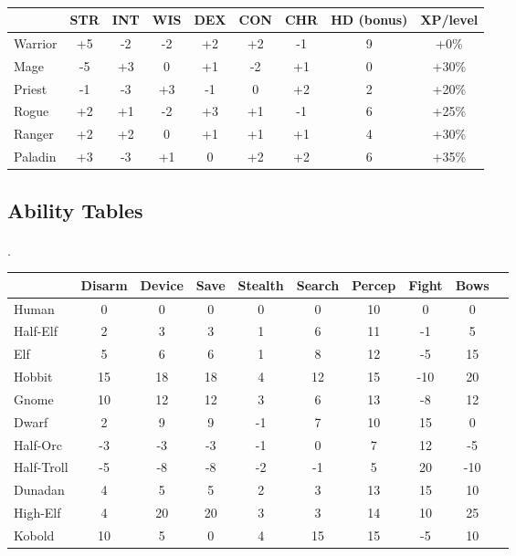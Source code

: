 \paragraph{}
\begin{tabular}{|l|c|c|c|c|c|c|c|c|}
\hline
   & STR & INT & WIS & DEX & CON & CHR & HD (bonus) & XP/level \\
\hline
Warrior & +5 & -2 & -2 & +2 & +2 & -1 & 9 & +0\%\\
Mage & -5 & +3 & 0 & +1 & -2 & +1 & 0 & +30\%\\
Priest & -1 & -3 & +3 & -1 & 0 & +2 & 2 & +20\%\\
Rogue & +2 & +1 & -2 & +3 & +1 & -1 & 6 & +25\%\\
Ranger & +2 & +2 & 0 & +1 & +1 & +1 & 4 & +30\%\\
Paladin & +3 & -3 & +1 & 0 & +2 & +2 & 6 & +35\%\\
\hline
\end{tabular}

\subsection{Ability Tables}
\paragraph{}.\\
\begin{tabular}{|l|c|c|c|c|c|c|c|c|c|}
\hline
        & Disarm & Device & Save & Stealth & Search & Percep & Fight &
        Bows\\
\hline
Human      & 0  &  0 & 0  &  0 &  0 & 10 &  0  &  0\\
Half-Elf   & 2  &  3 & 3  &  1 &  6 & 11 & -1  &  5\\
Elf        & 5  &  6 & 6  &  1 &  8 & 12 & -5  & 15\\
Hobbit     & 15 & 18 & 18 &  4 & 12 & 15 & -10 & 20\\
Gnome      & 10 & 12 & 12 &  3 &  6 & 13 & -8  & 12\\
Dwarf      & 2  &  9 & 9  & -1 &  7 & 10 & 15  &  0\\
Half-Orc   & -3 & -3 & -3 & -1 &  0 &  7 & 12  & -5\\
Half-Troll & -5 & -8 & -8 & -2 & -1 &  5 & 20  & -10\\
Dunadan    & 4  &  5 & 5  &  2 &  3 & 13 & 15  & 10\\
High-Elf   & 4  & 20 & 20 &  3 &  3 & 14 & 10  & 25\\
Kobold     & 10 &  5 & 0  &  4 & 15 & 15 & -5  & 10\\
\hline
\end{tabular}

